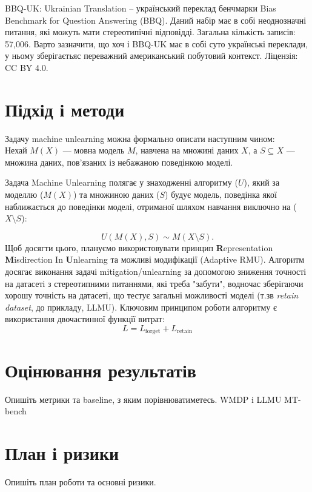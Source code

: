 \documentclass[ukrainian]{ucuproposal}
\begin{document}
BBQ-UK: Ukrainian Translation\cite{makovska_etal_2026_bbq_uk} -- український переклад бенчмарки Bias Benchmark for Question Answering (BBQ).\cite{parrish-etal-2022-bbq}
Даний набір має в собі неоднозначні питання, які можуть мати стереотипічні відповідді. Загальна кількість записів: 57,006. Варто зазначити, що хоч і BBQ-UK має в собі суто українські переклади, у ньому зберігаєтьяс переважний американський побутовий контекст. Ліцензія: CC BY 4.0.
\section{Підхід і методи}
Задачу machine unlearning можна формально описати наступним чином: \\
Нехай $M(X)$ — мовна модель $M$, навчена на множині даних $X$, а $S \subseteq X$ — множина даних, пов'язаних із небажаною поведінкою моделі.

Задача Machine Unlearning полягає у знаходженні алгоритму ($U$), який за моделлю ($M(X)$) та множиною даних ($S$) будує модель, поведінка якої наближається до поведінки моделі, отриманої шляхом навчання виключно на ($X \setminus S$):

\[
  U(M(X), S) \sim M(X \setminus S).
\]
Щоб досягти цього, плануємо використовувати принцип \textbf{R}epresentation \textbf{M}isdirection In \textbf{U}nlearning та можливі модифікації (Adaptive RMU).
Алгоритм досягає виконання задачі mitigation/unlearning за допомогою зниження точності на датасеті з стереотипними питаннями, які треба "забути", водночас зберігаючи хорошу точність на датасеті, що тестує загальні можливості моделі (т.зв \textit{retain dataset}, до прикладу, LLMU). Ключовим принципом роботи алгоритму є використання двочастинної функції витрат:
\[
L = L_{\mathrm{forget}} + L_{\mathrm{retain}}
\]
\section{Оцінювання результатів}
Опишіть метрики та baseline, з яким порівнюватиметесь.
WMDP i LLMU MT-bench
\section{План і ризики}
Опишіть план роботи та основні ризики.

\end{document}
